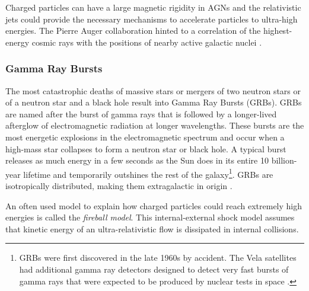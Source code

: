 Charged particles can have a large magnetic rigidity in AGNs and the relativistic jets could provide the necessary mechanisms to accelerate particles to ultra-high energies. The Pierre Auger collaboration hinted to a correlation of the highest-energy cosmic rays with the positions of nearby active galactic nuclei \cite{Abraham:2007si}.

\subsubsection{Gamma Ray Bursts}
\label{subsubsec:grb}
The most catastrophic deaths of massive stars or mergers of two neutron stars or of a neutron star and a black hole result into Gamma Ray Bursts (GRBs). GRBs are named after the burst of gamma rays that is followed by a longer-lived afterglow of electromagnetic radiation at longer wavelengths. These bursts are the most energetic explosions in the electromagnetic spectrum and occur when a high-mass star collapses to form a neutron star or black hole. A typical burst releases as much energy in a few seconds as the Sun does in its entire 10 billion-year lifetime and temporarily outshines the rest of the galaxy\footnote{GRBs were first discovered in the late 1960s by accident. The Vela satellites had additional gamma ray detectors designed to detect very fast bursts of gamma rays that were expected to be produced by nuclear tests in space \cite{Klebesadel:1973iq}.}. GRBs are isotropically distributed, making them extragalactic in origin \cite{Meegan:1992xg}.

An often used model to explain how charged particles could reach extremely high energies is called the \textit{fireball model}. This internal-external shock model assumes that kinetic energy of an ultra-relativistic flow is dissipated in internal collisions. \\

